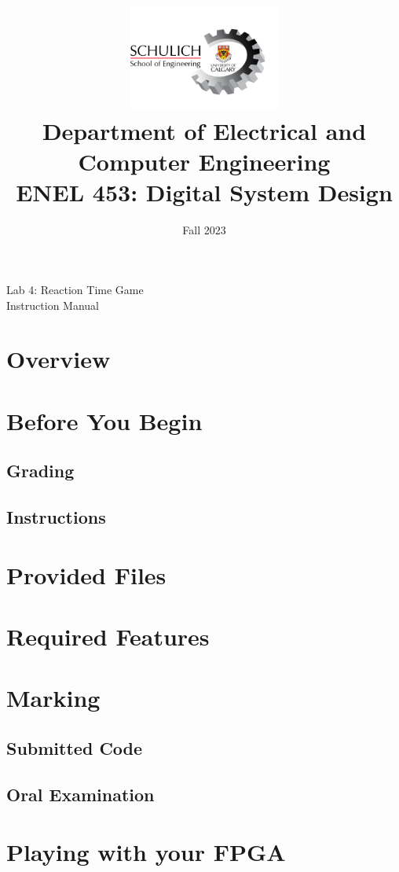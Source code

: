 \documentclass{article}
\title{
  \includegraphics[width=5cm]{Images/Logo.png}\\
  \normalsize Department of Electrical and Computer Engineering\\
  ENEL 453: Digital System Design
}
\date{Fall 2023}
\makeatletter
\renewcommand{\maketitle}{%
  \begin{center}
    {\@title}
    \vspace{1cm} %
    {\@date}
  \end{center}
}
\makeatother
\begin{document}
\centering

\maketitle
\large Lab 4: Reaction Time Game  \\
Instruction Manual

\RaggedRight
\section{Overview}
    
\section{Before You Begin}
    \subsection{Grading}
        
    \subsection{Instructions}
        
\section{Provided Files}
    
\section{Required Features}
    
\section{Marking}
    \subsection{Submitted Code}
        
    \subsection{Oral Examination}
        
\section{Playing with your FPGA}
    
\end{document}
